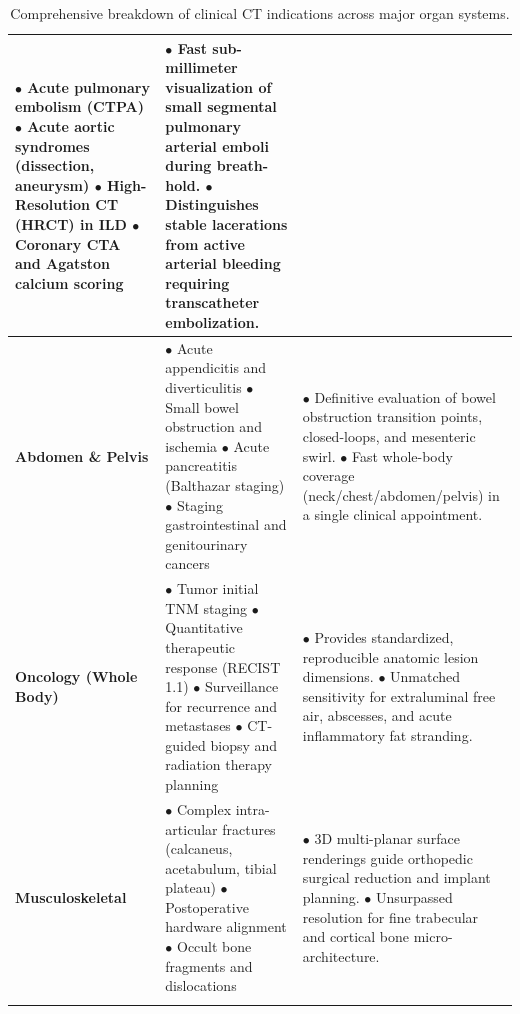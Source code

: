 \documentclass[11pt,a4paper]{article}
\begin{document}
\begin{longtable}{p{3.2cm}p{6cm}p{6cm}}
$\bullet$ Acute pulmonary embolism (CTPA)\newline
$\bullet$ Acute aortic syndromes (dissection, aneurysm)\newline
$\bullet$ High-Resolution CT (HRCT) in ILD\newline
$\bullet$ Coronary CTA and Agatston calcium scoring & 
$\bullet$ Fast sub-millimeter visualization of small segmental pulmonary arterial emboli during breath-hold.\newline
$\bullet$ Distinguishes stable lacerations from active arterial bleeding requiring transcatheter embolization. \\
\midrule
\textbf{Abdomen \& Pelvis} & 
$\bullet$ Acute appendicitis and diverticulitis\newline
$\bullet$ Small bowel obstruction and ischemia\newline
$\bullet$ Acute pancreatitis (Balthazar staging)\newline
$\bullet$ Staging gastrointestinal and genitourinary cancers & 
$\bullet$ Definitive evaluation of bowel obstruction transition points, closed-loops, and mesenteric swirl.\newline
$\bullet$ Fast whole-body coverage (neck/chest/abdomen/pelvis) in a single clinical appointment. \\
\midrule
\textbf{Oncology (Whole Body)} & 
$\bullet$ Tumor initial TNM staging\newline
$\bullet$ Quantitative therapeutic response (RECIST 1.1)\newline
$\bullet$ Surveillance for recurrence and metastases\newline
$\bullet$ CT-guided biopsy and radiation therapy planning & 
$\bullet$ Provides standardized, reproducible anatomic lesion dimensions.\newline
$\bullet$ Unmatched sensitivity for extraluminal free air, abscesses, and acute inflammatory fat stranding. \\
\midrule
\textbf{Musculoskeletal} & 
$\bullet$ Complex intra-articular fractures (calcaneus, acetabulum, tibial plateau)\newline
$\bullet$ Postoperative hardware alignment\newline
$\bullet$ Occult bone fragments and dislocations & 
$\bullet$ 3D multi-planar surface renderings guide orthopedic surgical reduction and implant planning.\newline
$\bullet$ Unsurpassed resolution for fine trabecular and cortical bone micro-architecture. \\
\bottomrule
\caption{Comprehensive breakdown of clinical CT indications across major organ systems.}
\label{tab:clinical_indications}
\end{longtable}
\end{document}
